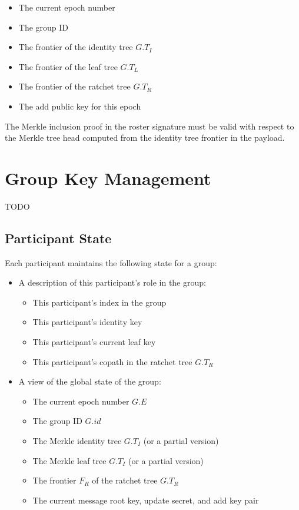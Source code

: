 \documentclass[11pt, oneside]{article}
\begin{document}
\begin{itemize}
\item{The current epoch number}
\item{The group ID}
\item{The frontier of the identity tree $G.T_I$}
\item{The frontier of the leaf tree $G.T_L$}
\item{The frontier of the ratchet tree $G.T_R$}
\item{The add public key for this epoch}
\end{itemize}

The Merkle inclusion proof in the roster signature must be valid with respect to the Merkle tree head computed from the identity tree frontier in the payload.


\section{Group Key Management}

TODO

\subsection{Participant State}

Each participant maintains the following state for a group:

\begin{itemize}
\item{A description of this participant's role in the group:
	\begin{itemize}
	\item{This participant's index in the group}
	\item{This participant's identity key}
	\item{This participant's current leaf key}
	\item{This participant's copath in the ratchet tree $G.T_R$}
	\end{itemize}
}
\item{A view of the global state of the group:
	\begin{itemize}
	\item{The current epoch number $G.E$}
	\item{The group ID $G.id$}
	\item{The Merkle identity tree $G.T_I$ (or a partial version)}
	\item{The Merkle leaf tree $G.T_I$ (or a partial version)}
	\item{The frontier $F_R$ of the ratchet tree $G.T_R$}
	\item{The current message root key, update secret, and add key pair}
	\end{itemize}
}
\end{itemize}
\end{document}
